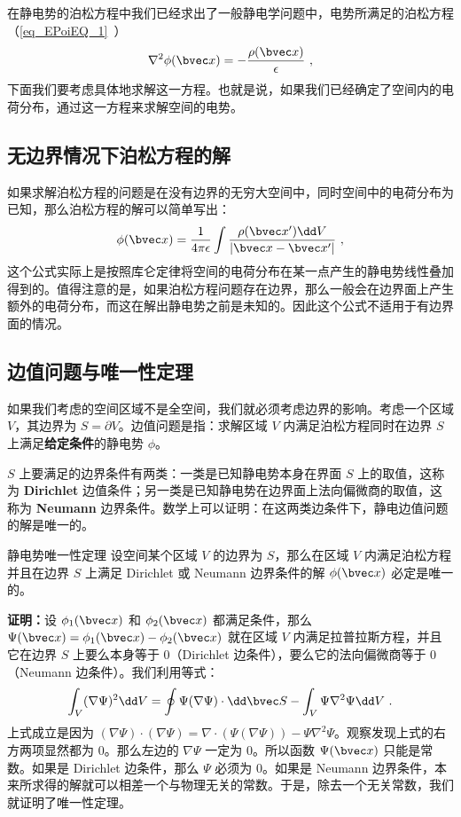 

在静电势的泊松方程中我们已经求出了一般静电学问题中，电势所满足的泊松方程（\autoref{eq_EPoiEQ_1}~）
\begin{align}
\nabla^2 \phi(\bvec x)=-\frac{\rho(\bvec x)}{\epsilon}~,
\end{align}
下面我们要考虑具体地求解这一方程。也就是说，如果我们已经确定了空间内的电荷分布，通过这一方程来求解空间的电势。
\subsection{无边界情况下泊松方程的解}
如果求解泊松方程的问题是在没有边界的无穷大空间中，同时空间中的电荷分布为已知，那么泊松方程的解可以简单写出：
\begin{align}
\phi(\bvec x)=\frac{1}{4\pi \epsilon}\int \frac{\rho (\bvec x')\dd V}{|\bvec x-\bvec x'|}~,
\end{align}
这个公式实际上是按照库仑定律将空间的电荷分布在某一点产生的静电势线性叠加得到的。值得注意的是，如果泊松方程问题存在边界，那么一般会在边界面上产生额外的电荷分布，而这在解出静电势之前是未知的。因此这个公式不适用于有边界面的情况。

\subsection{边值问题与唯一性定理}
如果我们考虑的空间区域不是全空间，我们就必须考虑边界的影响。考虑一个区域 $V$，其边界为 $S=\partial V$。边值问题是指：求解区域 $V$ 内满足泊松方程同时在边界 $S$ 上满足\textbf{给定条件}的静电势 $\phi$。

$S$ 上要满足的边界条件有两类：一类是已知静电势本身在界面 $S$
上的取值，这称为 \textbf{Dirichlet} 边值条件；另一类是已知静电势在边界面上法向偏微商的取值，这称为 \textbf{Neumann} 边界条件。数学上可以证明：在这两类边条件下，静电边值问题的解是唯一的。
\begin{theorem}{静电势唯一性定理}\label{the_empoi_1}
设空间某个区域 $V$ 的边界为 $S$，那么在区域 $V$ 内满足泊松方程并且在边界 $S$ 上满足 Dirichlet 或 Neumann 边界条件的解 $\phi(\bvec x)$ 必定是唯一的。
\end{theorem}
\textbf{证明：}设 $\phi_1(\bvec x)$ 和 $\phi_2(\bvec x)$ 都满足条件，那么 $\Psi(\bvec x)=\phi_1(\bvec x)-\phi_2(\bvec x)$ 就在区域 $V$ 内满足拉普拉斯方程，并且它在边界 $S$ 上要么本身等于 $0$（Dirichlet 边条件），要么它的法向偏微商等于 $0$（Neumann 边条件）。我们利用等式：
\begin{align}
\int_V (\nabla \Psi)^2 \dd V=\oint \Psi(\nabla \Psi)\cdot \dd \bvec S - \int_V \Psi \nabla^2\Psi \dd V~.
\end{align}
上式成立是因为 $(\nabla \Psi)\cdot (\nabla \Psi)=\nabla\cdot (\Psi(\nabla\Psi))-\Psi\nabla^2\Psi$。观察发现上式的右方两项显然都为 $0$。那么左边的 $\nabla\Psi$ 一定为 $0$。所以函数 $\Psi(\bvec x)$ 只能是常数。如果是 Dirichlet 边条件，那么 $\Psi$ 必须为 $0$。如果是 Neumann 边界条件，本来所求得的解就可以相差一个与物理无关的常数。于是，除去一个无关常数，我们就证明了唯一性定理。

